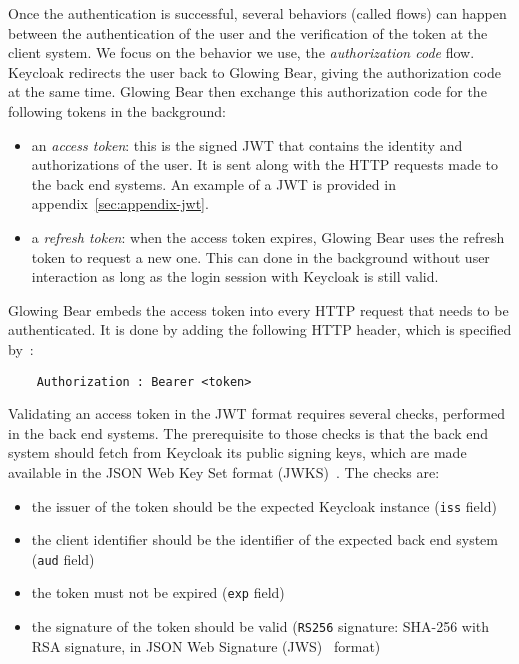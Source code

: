 Once the authentication is successful, several behaviors (called flows) can happen between the authentication of the user and the verification of the token at the client system.
We focus on the behavior we use, the \emph{authorization code} flow.
Keycloak redirects the user back to Glowing Bear, giving the authorization code at the same time.
Glowing Bear then exchange this authorization code for the following tokens in the background:

\begin{itemize}
    \item an \emph{access token}: this is the signed JWT that contains the identity and authorizations of the user. It is sent along with the HTTP requests made to the back end systems. An example of a JWT is provided in appendix~\ref{sec:appendix-jwt}.
    \item a \emph{refresh token}: when the access token expires, Glowing Bear uses the refresh token to request a new one. This can done in the background without user interaction as long as the login session with Keycloak is still valid.
\end{itemize}

Glowing Bear embeds the access token into every HTTP request that needs to be authenticated.
It is done by adding the following HTTP header, which is specified by~\cite{todo rfc}:
\begin{verbatim}
    Authorization : Bearer <token>
\end{verbatim}

Validating an access token in the JWT format requires several checks, performed in the back end systems.
The prerequisite to those checks is that the back end system should fetch from Keycloak its public signing keys, which are made available in the JSON Web Key Set format (JWKS)~\cite{todo}.
The checks are:

\begin{itemize}
    \item the issuer of the token should be the expected Keycloak instance (\verb|iss| field)
    \item the client identifier should be the identifier of the expected back end system (\verb|aud| field)
    \item the token must not be expired (\verb|exp| field)
    \item the signature of the token should be valid (\verb|RS256| signature: SHA-256 with RSA signature, in JSON Web Signature (JWS)~\cite{todo} format)
\end{itemize}

